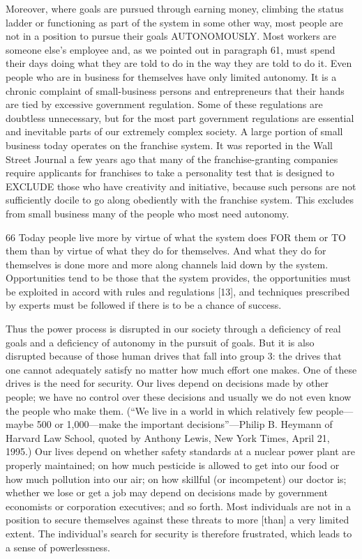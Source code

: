  Moreover, where goals are pursued through earning money, climbing the status ladder or functioning as part of the system in some other way, most people are not in a position to pursue their goals AUTONOMOUSLY. Most workers are someone else’s employee and, as we pointed out in paragraph 61, must spend their days doing what they are told to do in the way they are told to do it. Even people who are in business for themselves have only limited autonomy. It is a chronic complaint of small-business persons and entrepreneurs that their hands are tied by excessive government regulation. Some of these regulations are doubtless unnecessary, but for the most part government regulations are essential and inevitable parts of our extremely complex society. A large portion of small business today operates on the franchise system. It was reported in the Wall Street Journal a few years ago that many of the franchise-granting companies require applicants for franchises to take a personality test that is designed to EXCLUDE those who have creativity and initiative, because such persons are not sufficiently docile to go along obediently with the franchise system. This excludes from small business many of the people who most need autonomy.

{66} Today people live more by virtue of what the system does FOR them or TO them than by virtue of what they do for themselves. And what they do for themselves is done more and more along channels laid down by the system. Opportunities tend to be those that the system provides, the opportunities must be exploited in accord with rules and regulations [13], and techniques prescribed by experts must be followed if there is to be a chance of success.

 Thus the power process is disrupted in our society through a deficiency of real goals and a deficiency of autonomy in the pursuit of goals. But it is also disrupted because of those human drives that fall into group 3: the drives that one cannot adequately satisfy no matter how much effort one makes. One of these drives is the need for security. Our lives depend on decisions made by other people; we have no control over these decisions and usually we do not even know the people who make them. (“We live in a world in which relatively few people—maybe 500 or 1,000—make the important decisions”—Philip B. Heymann of Harvard Law School, quoted by Anthony Lewis, New York Times, April 21, 1995.) Our lives depend on whether safety standards at a nuclear power plant are properly maintained; on how much pesticide is allowed to get into our food or how much pollution into our air; on how skillful (or incompetent) our doctor is; whether we lose or get a job may depend on decisions made by government economists or corporation executives; and so forth. Most individuals are not in a position to secure themselves against these threats to more [than] a very limited extent. The individual’s search for security is therefore frustrated, which leads to a sense of powerlessness.

